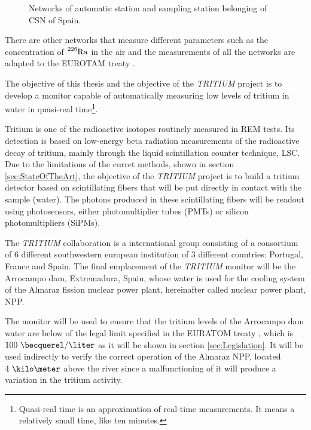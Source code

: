 \begin{figure}[hbtp]
 \centering
 \caption{Networks of automatic station and sampling station belonging of CSN of Spain.}
 \label{fig:NetworksCSN}
\end{figure}

There are other networks that measure different parameters such as the concentration of $\ce{^{226}Ra}$ in the air and the measurements of all the networks are adapted to the EUROTAM treaty \cite{100BqL}.

The objective of this thesis and the objective of the \textit{TRITIUM} project is to develop a monitor capable of automatically measuring low levels of tritium in water in quasi-real time\footnote{Quasi-real time is an approximation of real-time measurements. It means a relatively small time, like ten minutes.}. 

Tritium is one of the radioactive isotopes routinely measured in REM tests. Its detection is based on low-energy beta radiation measurements of the radioactive decay of tritium, mainly through the liquid scintillation counter technique, LSC. Due to the limitations of the curret methods, shown in section \ref{sec:StateOfTheArt}, the objective of the \textit{TRITIUM} project is to build a tritium detector based on scintillating fibers that will be put directly in contact with the sample (water). The photons produced in these scintillating fibers will be readout using photosensors, either photomultiplier tubes (PMTs) or silicon photomultipliers (SiPMs). 

The \textit{TRITIUM} collaboration is a international group consisting of a consortium of 6 different southwestern european institution of 3 different countries: Portugal, France and Spain. The final emplacement of the \textit{TRITIUM} monitor will be the Arrocampo dam, Extremadura, Spain, whose water is used for the cooling system of the Almaraz fission nuclear power plant, hereinafter called nuclear power plant, NPP.

The monitor will be used to ensure that the tritium levels of the Arrocampo dam  water are below of the legal limit specified in the EURATOM treaty \cite{100BqL}, which is $100~\becquerel/\liter$ as it will be shown in section \ref{sec:Legislation}. It will be used indirectly to verify the correct operation of the Almaraz NPP, located $4~\kilo\meter$ above the river since a malfunctioning of it will produce a variation in the tritium activity.

